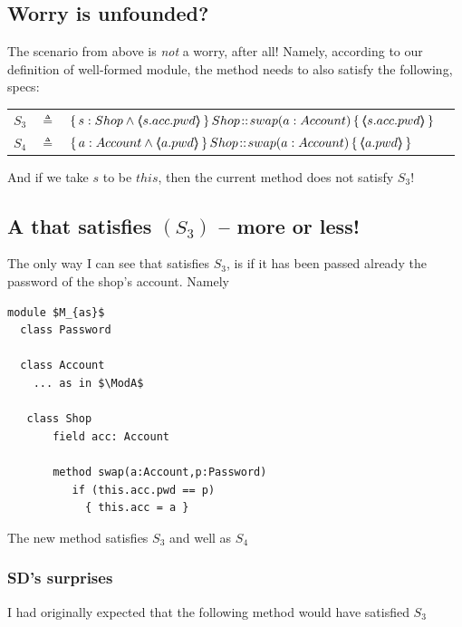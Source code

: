 \subsection{Worry is unfounded?}

The scenario from above is \emph{not} a worry, after all! 
Namely, according to our definition of well-formed module, the method  needs to also satisfy the following, specs:

\begin{tabular}{lcll}
 $S_{3}$   & $ \triangleq$ &%
					 ${\mprepostLong 
					 {s:Shop \wedge \inside{s.acc.pwd} }  
					 {Shop}
					 {swap}
					 {a:Account}
					{\inside {s.acc.pwd}}
					}$
\\
 $S_{4}$   & $ \triangleq$ &%
					 ${\mprepostLong 
					 {a:Account \wedge \inside {a.pwd} }
					 {Shop}
					 {swap}
					 {a:Account}
					{ \inside {a.pwd} }
					}$					
\end{tabular}					
					
 And if we take $s$ to be $this$, then the current method  does not satisfy $S_3$!
 
 \subsection{A  that satisfies $(S_3)$ -- more or less!}
 
The only way I can see that   satisfies $S_3$, is if it has been passed already the password of the shop's account. Namely
 
 \begin{lstlisting}[mathescape=true, language=Chainmail, frame=lines,firstline=10]
module $M_{as}$        
  class Password
  
  class Account
    ... as in $\ModA$
    
   class Shop
       field acc: Account
       
       method swap(a:Account,p:Password)
          if (this.acc.pwd == p)
          	{ this.acc = a }    
\end{lstlisting}

The new method  satisfies $S_3$ and well as $S_4$

\subsubsection{SD's surprises}

I had originally expected that the following method would have satisfied $S_3$

